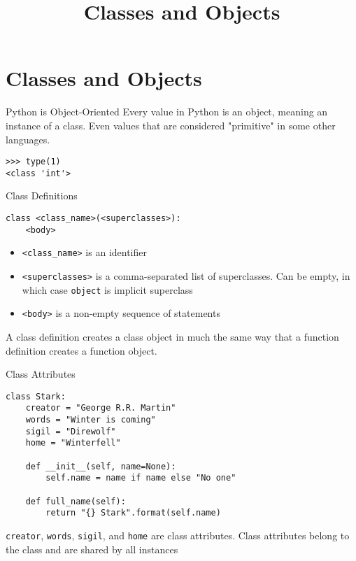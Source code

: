 \documentclass[smaller]{beamer}
\author{}
\date{}
\title{Classes and Objects}
\begin{document}
\maketitle

\section{Classes and Objects}
\label{sec-1}

\begin{frame}[fragile,label=sec-1-1]{Python is Object-Oriented}
 Every value in Python is an object, meaning an instance of a class. Even values that are considered "primitive" in some other languages.

\lstset{language=Python,label= ,caption= ,numbers=none}
\begin{lstlisting}
>>> type(1)
<class 'int'>
\end{lstlisting}
\end{frame}


\begin{frame}[fragile,label=sec-1-2]{Class Definitions}
 \lstset{language=Python,label= ,caption= ,numbers=none}
\begin{lstlisting}
class <class_name>(<superclasses>):
    <body>
\end{lstlisting}

\begin{itemize}
\item \verb~<class_name>~ is an identifier
\item \verb~<superclasses>~ is a comma-separated list of superclasses. Can be empty, in which case \verb~object~ is implicit superclass
\item \verb~<body>~ is a non-empty sequence of statements
\end{itemize}

A class definition creates a class object in much the same way that a function definition creates a function object.
\end{frame}

\begin{frame}[fragile,label=sec-1-3]{Class Attributes}
 \lstset{language=Python,label= ,caption= ,numbers=none}
\begin{lstlisting}
class Stark:
    creator = "George R.R. Martin"
    words = "Winter is coming"
    sigil = "Direwolf"
    home = "Winterfell"

    def __init__(self, name=None):
        self.name = name if name else "No one"

    def full_name(self):
        return "{} Stark".format(self.name)
\end{lstlisting}

\verb~creator~, \verb~words~, \verb~sigil~, and \verb~home~ are \alert{class attributes}. Class attributes belong to the class and are shared by all instances
\end{frame}
\end{document}
